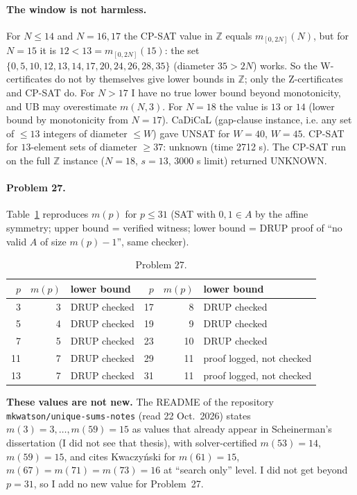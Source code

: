 \documentclass[11pt]{article}
\begin{document}
\paragraph{The window is not harmless.} For $N\le14$ and $N=16,17$ the CP-SAT value in $\mathbb Z$ equals $m_{[0,2N]}(N)$, but for $N=15$ it is $12<13=m_{[0,2N]}(15)$: the set $\{0,5,10,12,13,14,17,20,24,26,28,35\}$ (diameter $35>2N$) works. So the W-certificates do not by themselves give lower bounds in $\mathbb Z$; only the Z-certificates and CP-SAT do. For $N>17$ I have no true lower bound beyond monotonicity, and UB may overestimate $m(N,3)$. For $N=18$ the value is $13$ or $14$ (lower bound by monotonicity from $N=17$). CaDiCaL (gap-clause instance, i.e. any set of $\le13$ integers of diameter $\le W$) gave UNSAT for $W=40$, $W=45$. CP-SAT for $13$-element sets of diameter $\ge37$: unknown (time 2712 s). The CP-SAT run on the full $\mathbb Z$ instance ($N=18$, $s=13$, 3000 s limit) returned UNKNOWN.

\paragraph{Problem 27.} Table~\ref{tab:g27} reproduces $m(p)$ for $p\le 31$ (SAT with $0,1\in A$ by the affine symmetry; upper bound = verified witness; lower bound = DRUP proof of ``no valid $A$ of size $m(p)-1$'', same checker).
\begin{table}[h]
\centering\small
\begin{tabular}{@{}rrl|rrl@{}}
\toprule
$p$ & $m(p)$ & lower bound & $p$ & $m(p)$ & lower bound\\
\midrule
3 & 3 & DRUP checked & 17 & 8 & DRUP checked \\
5 & 4 & DRUP checked & 19 & 9 & DRUP checked \\
7 & 5 & DRUP checked & 23 & 10 & DRUP checked \\
11 & 7 & DRUP checked & 29 & 11 & proof logged, not checked \\
13 & 7 & DRUP checked & 31 & 11 & proof logged, not checked \\
\bottomrule
\end{tabular}
\caption{Problem 27.}\label{tab:g27}
\end{table}
\textbf{These values are not new.} The README of the repository \texttt{mkwatson/unique-sums-notes} \cite{notes} (read 22 Oct.\ 2026) states $m(3)=3,\dots,m(59)=15$ as values that already appear in Scheinerman's dissertation (I did not see that thesis), with solver-certified $m(53)=14$, $m(59)=15$, and cites Kwaczy\'nski for $m(61)=15$, $m(67)=m(71)=m(73)=16$ at ``search only'' level. I did not get beyond $p=31$, so I add no new value for Problem~27.
\end{document}
